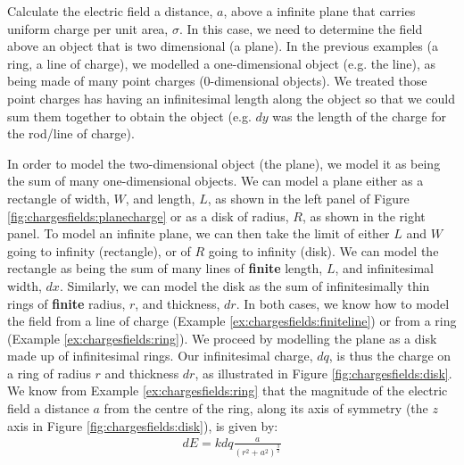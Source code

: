\begin{example}{\label{ex:chargesfields:squarecircle}Calculate the electric field a distance, $a$, above a infinite plane that carries uniform charge per unit area, $\sigma$.}
In this case, we need to determine the field above an object that is two dimensional (a plane). In the previous examples (a ring, a line of charge), we modelled a one-dimensional object (e.g. the line), as being made of many point charges (0-dimensional objects). We treated those point charges has having an infinitesimal length along the object so that we could sum them together to obtain the object (e.g. $dy$ was the length of the charge for the rod/line of charge).
 
In order to model the two-dimensional object (the plane), we model it as being the sum of many one-dimensional objects. We can model a plane either as a rectangle of width, $W$, and length, $L$, as shown in the left panel of Figure \ref{fig:chargesfields:planecharge} or as a disk of radius, $R$, as shown in the right panel. To model an infinite plane, we can then take the limit of either $L$ and $W$ going to infinity (rectangle), or of $R$ going to infinity (disk). We can model the rectangle as being the sum of many lines of \textbf{finite} length, $L$, and infinitesimal width, $dx$. Similarly, we can model the disk as the sum of infinitesimally thin rings of \textbf{finite} radius, $r$, and thickness, $dr$. In both cases, we know how to model the field from a line of charge (Example \ref{ex:chargesfields:finiteline}) or from a ring (Example \ref{ex:chargesfields:ring}). 
We proceed by modelling the plane as a disk made up of infinitesimal rings. Our infinitesimal charge, $dq$, is thus the charge on a ring of radius $r$ and thickness $dr$, as illustrated in Figure \ref{fig:chargesfields:disk}.
We know from Example \ref{ex:chargesfields:ring} that the magnitude of the electric field a distance $a$ from the centre of the ring, along its axis of symmetry (the $z$ axis in Figure \ref{fig:chargesfields:disk}), is given by:
\begin{align*}
dE = kdq\frac{a}{(r^2+a^2)^\frac{3}{2}} 
\end{align*}

\end{example}
